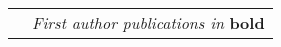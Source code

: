 \documentclass[
    10pt, %
]{FreemanCV}
\begin{document}
\begin{paracol}{2}
\begin{supertabular}{r l}

    & \textit{First author publications in} \textbf{bold}\\


\end{supertabular}

\medskip %


\end{paracol} %

\end{document}
